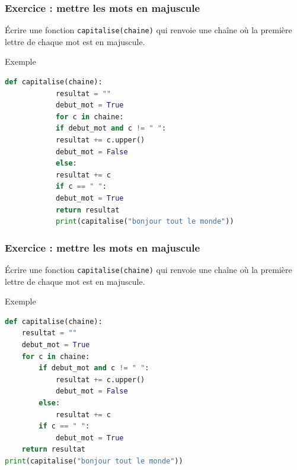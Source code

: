 \documentclass[10pt, xcolor={svgnames}]{beamer}
\begin{document}
\begin{frame}[containsverbatim]
	\frametitle{Exercice : mettre les mots en majuscule}
	
	\begin{block}{}
		Écrire une fonction \texttt{capitalise(chaine)}
		qui renvoie une chaîne où la première lettre
		de chaque mot est en majuscule.
	\end{block}
	\pause
	
	\begin{exampleblock}{Exemple}
		\begin{lstlisting}[language=Python]
			def capitalise(chaine):
			resultat = ""
			debut_mot = True
			for c in chaine:
			if debut_mot and c != " ":
			resultat += c.upper()
			debut_mot = False
			else:
			resultat += c
			if c == " ":
			debut_mot = True
			return resultat
			print(capitalise("bonjour tout le monde"))
		\end{lstlisting}
	\end{exampleblock}
	
\end{frame}
\begin{frame}[containsverbatim]
	\frametitle{Exercice : mettre les mots en majuscule}
	
	\begin{block}{}
		Écrire une fonction \texttt{capitalise(chaine)}
		qui renvoie une chaîne où la première lettre
		de chaque mot est en majuscule.
	\end{block}

	
	\begin{exampleblock}{Exemple}
		\begin{lstlisting}[language=Python]
def capitalise(chaine):
	resultat = ""
	debut_mot = True
	for c in chaine:
		if debut_mot and c != " ":
			resultat += c.upper()
			debut_mot = False
		else:
			resultat += c
		if c == " ":
			debut_mot = True
	return resultat
print(capitalise("bonjour tout le monde"))
		\end{lstlisting}
	\end{exampleblock}
	
\end{frame}
\end{document}

